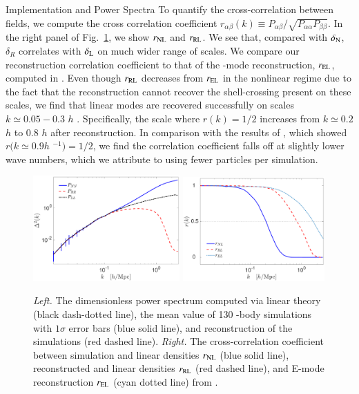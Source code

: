 \begin{section}{Implementation and Power Spectra}
 To quantify the cross-correlation
 between fields, we compute the cross correlation coefficient
 $r_{\alpha\beta}(k)\equiv P_{\alpha\beta}/\sqrt{P_{\alpha\alpha}P_{\beta\beta}}$.  In the right panel of
 Fig.~\ref{fig:cp}, we show $r_{\mathrm{\textcolor{black}{NL}}}$ and $r_{\mathrm{\textcolor{black}{RL}}}$.  We see that, compared with $\delta_\mathrm{\textcolor{black}{N}}$,
 $\delta_R$ correlates with $\delta_\mathrm{\textcolor{black}{L}}$ on much wider range of scales.
 We compare our reconstruction correlation coefficient to that of the -mode 
 reconstruction, $r_{\mathrm{\textcolor{black}{EL}}}$, 
 computed in \citealt{bib:Yu2016}.
 Even though $r_{\mathrm{\textcolor{black}{RL}}}$ decreases from $r_{\mathrm{\textcolor{black}{EL}}}$ in the nonlinear regime due to the fact that the  reconstruction 
 cannot recover the shell-crossing present on these scales, we find that linear
 modes are recovered successfully on scales $k\simeq 0.05 - 0.3$ $h$ .
 Specifically, the scale where $r(k)=1/2$ increases from $k\simeq 0.2$ $h$  to
 $0.8$ $h$  after reconstruction.  In comparison with the results of \citet{bib:ZhuH2016},
 which showed $r(k\simeq0.9 h$ $^{-1})=1/2$, we find the correlation coefficient falls off at slightly lower
 wave numbers, which we attribute to using fewer particles per simulation.

  \begin{figure}
    \centering
    \includegraphics[width=0.5\textwidth]{fig2a.pdf}
    \includegraphics[width=0.485\textwidth]{fig2b.pdf}
    \caption{{\it Left.} The dimensionless power spectrum computed via
      linear theory (black dash-dotted line), the mean value of 130 -body
      simulations with $1\sigma$ error bars (blue solid line), and reconstruction
      of the simulations (red dashed line).  {\it Right.} The cross-correlation
      coefficient between simulation and linear densities $r_{\mathrm{\textcolor{black}{NL}}}$ (blue solid line),
       reconstructed and linear densities $r_{\mathrm{\textcolor{black}{RL}}}$ (red dashed line), and E-mode reconstruction $r_{\mathrm{\textcolor{black}{EL}}}$ (cyan dotted line) from \citealt{bib:Yu2016}.}
    \label{fig:cp}
  \end{figure}


\end{section}

